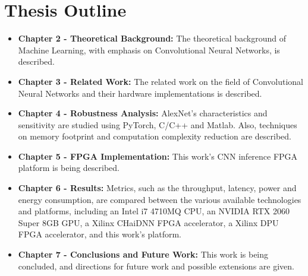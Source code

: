 \section{Thesis Outline}
\begin{itemize}
	\item \textbf{Chapter 2 - Theoretical Background:} The theoretical background of Machine Learning, with emphasis on Convolutional Neural Networks, is described.
	\item \textbf{Chapter 3 - Related Work:} The related work on the field of Convolutional Neural Networks and their hardware implementations is described.
	\item \textbf{Chapter 4 - Robustness Analysis:} AlexNet's characteristics and sensitivity are studied using PyTorch, C/C++ and Matlab. Also, techniques on memory footprint and computation complexity reduction are described.
	\item \textbf{Chapter 5 - FPGA Implementation:} This work's CNN inference FPGA platform is being described.
	\item \textbf{Chapter 6 - Results:} Metrics, such as the throughput, latency, power and energy consumption, are compared between the various available technologies and platforms, including an Intel i7 4710MQ CPU, an NVIDIA RTX 2060 Super 8GB GPU, a Xilinx CHaiDNN FPGA accelerator, a Xilinx DPU FPGA accelerator, and this work's platform.
	\item \textbf{Chapter 7 - Conclusions and Future Work:} This work is being concluded, and directions for future work and possible extensions are given.
\end{itemize}
